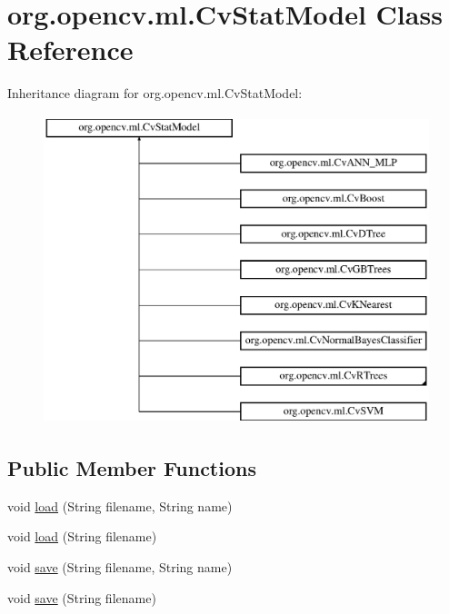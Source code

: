 \hypertarget{classorg_1_1opencv_1_1ml_1_1_cv_stat_model}{}\section{org.\+opencv.\+ml.\+Cv\+Stat\+Model Class Reference}
\label{classorg_1_1opencv_1_1ml_1_1_cv_stat_model}
Inheritance diagram for org.\+opencv.\+ml.\+Cv\+Stat\+Model\+:\begin{figure}[H]
\begin{center}
\leavevmode
\includegraphics[height=9.000000cm]{classorg_1_1opencv_1_1ml_1_1_cv_stat_model}
\end{center}
\end{figure}
\subsection*{Public Member Functions}
\begin{DoxyCompactItemize}
\item 
void \mbox{\hyperlink{classorg_1_1opencv_1_1ml_1_1_cv_stat_model_abb430a8a52c81e78bdcec2f4e15af735}{load}} (String filename, String name)
\item 
void \mbox{\hyperlink{classorg_1_1opencv_1_1ml_1_1_cv_stat_model_ae9355b39253491887827c8385cf0779d}{load}} (String filename)
\item 
void \mbox{\hyperlink{classorg_1_1opencv_1_1ml_1_1_cv_stat_model_ae9d5b22ad37f528258cc5165af9f3f61}{save}} (String filename, String name)
\item 
void \mbox{\hyperlink{classorg_1_1opencv_1_1ml_1_1_cv_stat_model_a48a3e488b527a6236709db13fe88112a}{save}} (String filename)
\end{DoxyCompactItemize}
